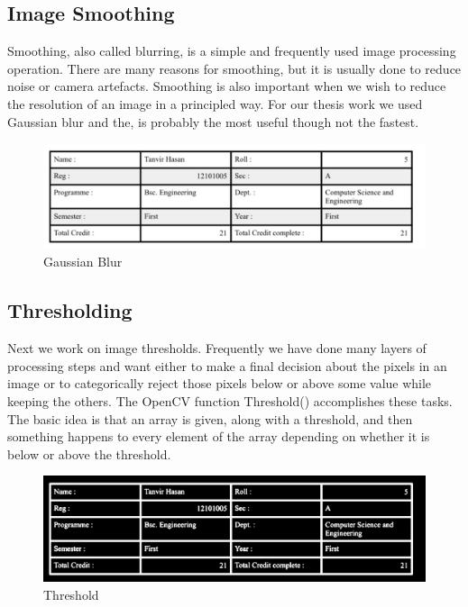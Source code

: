 \subsection{Image Smoothing}
Smoothing, also called blurring, is a simple and frequently used image processing operation.  There  are  many  reasons  for  smoothing,  but  it  is  usually  done  to  reduce  noise  or  camera artefacts. Smoothing is also important when we wish to reduce the resolution of an image in a principled way.\cite{OpenCVBook}
For our thesis work we used Gaussian blur and the, is probably the most useful though not the fastest.
\begin{figure}[h!]
\centering
\includegraphics[width=1\textwidth]{GaussianBlur}
\caption {Gaussian Blur}
\label {fig:GaussianBlur}
\end{figure}
\subsection{Thresholding}
Next we work on image thresholds. Frequently we have done many layers of processing steps and want either to make a final decision about the pixels in an image or to categorically reject those pixels below or above some value while keeping the others. The OpenCV function Threshold() accomplishes these tasks. The basic idea is that an array is given, along with a threshold, and then something happens to every element of the array depending on whether it is below or above the threshold.\cite{OpenCVBook}
\begin{figure}[h!]
\centering
\includegraphics[width=1\textwidth]{Threshold}
\caption {Threshold}
\label {fig:Threshold}
\end{figure}
